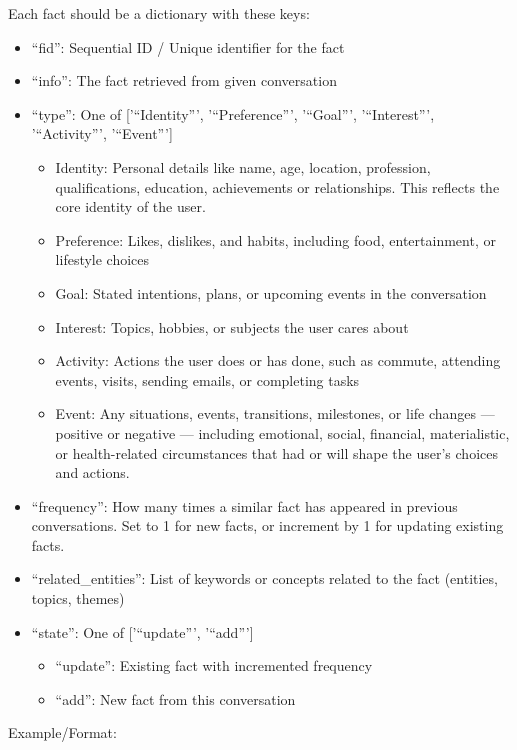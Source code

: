 \begin{promptbox}
Each fact should be a dictionary with these keys:
\begin{itemize}
  \item ``fid'': Sequential ID / Unique identifier for the fact
  \item ``info'': The fact retrieved from given conversation
  \item ``type'': One of ['``Identity''', '``Preference''', '``Goal''', '``Interest''', '``Activity''', '``Event''']
    \begin{itemize}
      \item Identity: Personal details like name, age, location, profession, qualifications, education, achievements or relationships. This reflects the core identity of the user.
      \item Preference: Likes, dislikes, and habits, including food, entertainment, or lifestyle choices
      \item Goal: Stated intentions, plans, or upcoming events in the conversation
      \item Interest: Topics, hobbies, or subjects the user cares about
      \item Activity: Actions the user does or has done, such as commute, attending events, visits, sending emails, or completing tasks
      \item Event: Any situations, events, transitions, milestones, or life changes — positive or negative — including emotional, social, financial, materialistic, or health-related circumstances that had or will shape the user’s choices and actions.
    \end{itemize}
  \item ``frequency'': How many times a similar fact has appeared in previous conversations. Set to 1 for new facts, or increment by 1 for updating existing facts.
  \item ``related\_entities'': List of keywords or concepts related to the fact (entities, topics, themes)
  \item ``state'': One of ['``update''', '``add''']
    \begin{itemize}
      \item ``update'': Existing fact with incremented frequency
      \item ``add'': New fact from this conversation
    \end{itemize}
\end{itemize}

Example/Format:


\end{promptbox}
